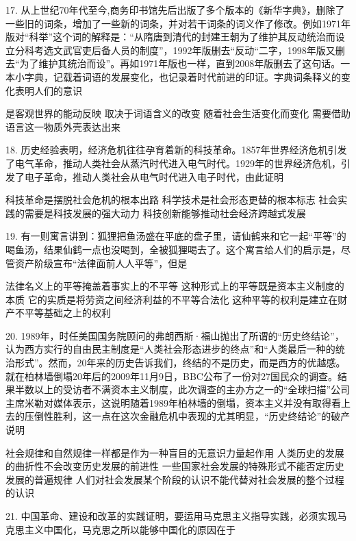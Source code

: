 17. 从上世纪70年代至今,商务印书馆先后出版了多个版本的《新华字典》，删除了一些旧的词条，增加了一些新的词条，并对若干词条的词义作了修改。例如1971年版对“科举”这个词的解释是：“从隋唐到清代的封建王朝为了维护其反动统治而设立分科考选文武官吏后备人员的制度”，1992年版删去“反动“二字，1998年版又删去“为了维护其统治而设”。再如1971年版也一样，直到2008年版删去了这句话。一本小字典，记载着词语的发展变化，也记录着时代前进的印证。字典词条释义的变化表明人们的意识
\begin{choices}
	 是客观世界的能动反映
	 取决于词语含义的改变
	 随着社会生活变化而变化
	 需要借助语言这一物质外壳表达出来
\end{choices}
18. 历史经验表明，经济危机往往孕育着新的科技革命。1857年世界经济危机引发了电气革命，推动人类社会从蒸汽时代进入电气时代。1929年的世界经济危机，引发了电子革命，推动人类社会从电气时代进入电子时代，由此证明
\begin{choices}
	 科技革命是摆脱社会危机的根本出路
	 科学技术是社会形态更替的根本标志
	 社会实践的需要是科技发展的强大动力
	 科技创新能够推动社会经济跨越式发展
\end{choices}
19. 有一则寓言讲到：狐狸把鱼汤盛在平底的盘子里，请仙鹤来和它一起“平等”的喝鱼汤，结果仙鹤一点也没喝到，全被狐狸喝去了。这个寓言给人们的启示是，尽管资产阶级宣布“法律面前人人平等”，但是
\begin{choices}
	 法律名义上的平等掩盖着事实上的不平等
	 这种形式上的平等既是资本主义制度的本质
	 它的实质是将劳资之间经济利益的不平等合法化
	 这种平等的权利是建立在财产不平等基础之上的权利
\end{choices}
20. 1989年，时任美国国务院顾问的弗朗西斯·福山抛出了所谓的“历史终结论”，认为西方实行的自由民主制度是“人类社会形态进步的终点”和“人类最后一种的统治形式”。然而，20年来的历史告诉我们，终结的不是历史，而是西方的优越感。就在柏林墙倒塌20年后的2009年11月9日，BBC公布了一份对27国民众的调查。结果半数以上的受访者不满资本主义制度，此次调查的主办方之一的“全球扫描”公司主席米勒对媒体表示，这说明随着1989年柏林墙的倒塌，资本主义并没有取得看上去的压倒性胜利，这一点在这次金融危机中表现的尤其明显，“历史终结论”的破产说明
\begin{choices}
	 社会规律和自然规律一样都是作为一种盲目的无意识力量起作用
	 人类历史的发展的曲折性不会改变历史发展的前进性
	 一些国家社会发展的特殊形式不能否定历史发展的普遍规律
	 人们对社会发展某个阶段的认识不能代替对社会发展的整个过程的认识
\end{choices}
21. 中国革命、建设和改革的实践证明，要运用马克思主义指导实践，必须实现马克思主义中国化，马克思之所以能够中国化的原因在于
